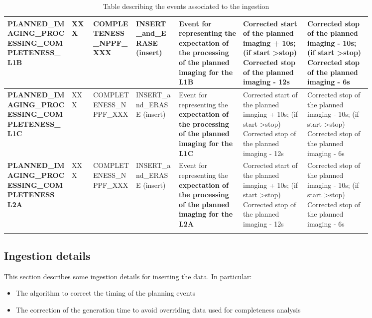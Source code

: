 \begin{landscape}
\begin{longtable}{|M{0.15\linewidth}|M{0.05\linewidth}|M{0.10\linewidth}|M{0.10\linewidth}|M{0.15\linewidth}|M{0.15\linewidth}|M{0.15\linewidth}|}
\textbf{PLANNED\_IMAGING\_PROCESSING\_COMPLETENESS\_L1B} & XXX & \- COMPLETENESS\_NPPF\_XXX & INSERT\_and\_ERASE (insert) & Event for representing the \textbf{expectation of the processing of the planned imaging for the L1B} & Corrected start of the planned imaging + 10s; (if start \textgreater  stop) Corrected stop of the planned imaging - 12s & Corrected stop of the planned imaging - 10s; (if start \textgreater  stop) Corrected stop of the planned imaging - 6s \\ \hline
\textbf{PLANNED\_IMAGING\_PROCESSING\_COMPLETENESS\_L1C} & XXX & \- COMPLETENESS\_NPPF\_XXX & INSERT\_and\_ERASE (insert) & Event for representing the \textbf{expectation of the processing of the planned imaging for the L1C} & Corrected start of the planned imaging + 10s; (if start \textgreater  stop) Corrected stop of the planned imaging - 12s & Corrected stop of the planned imaging - 10s; (if start \textgreater  stop) Corrected stop of the planned imaging - 6s \\ \hline
\textbf{PLANNED\_IMAGING\_PROCESSING\_COMPLETENESS\_L2A} & XXX & \- COMPLETENESS\_NPPF\_XXX & INSERT\_and\_ERASE (insert) & Event for representing the \textbf{expectation of the processing of the planned imaging for the L2A} & Corrected start of the planned imaging + 10s; (if start \textgreater  stop) Corrected stop of the planned imaging - 12s & Corrected stop of the planned imaging - 10s; (if start \textgreater  stop) Corrected stop of the planned imaging - 6s \\ \hline
\caption{Table describing the events associated to the ingestion}
\label{tb:description_events_ingestion_orbpre}
\end{longtable}
\end{landscape}

\subsection{Ingestion details}

This section describes some ingestion details for inserting the data. In particular:

\begin{itemize} 

\item The algorithm to correct the timing of the planning events

\item The correction of the generation time to avoid overriding data used for completeness analysis
  
\end{itemize}

